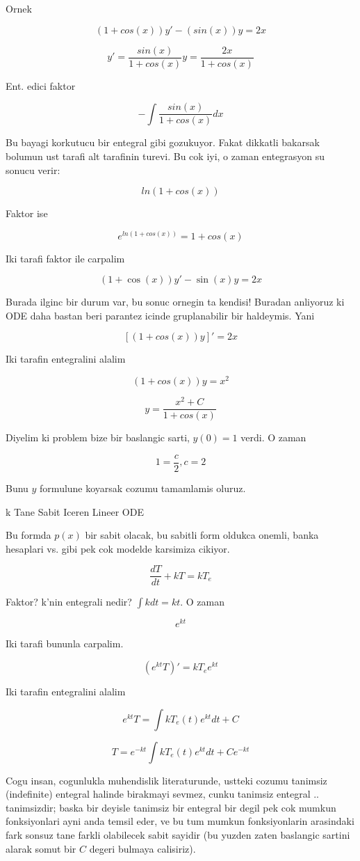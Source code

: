 \documentclass[12pt,fleqn]{article}\usepackage{../common}
\begin{document}
Ornek 

\[ (1+cos(x))y' - (sin(x))y = 2x \]

\[ y' = \frac{sin(x)}{1+cos(x)}y = \frac{2x}{1+cos(x)} \]

Ent. edici faktor

\[ - \int \frac{sin(x)}{1+cos(x)} dx \]

Bu bayagi korkutucu bir entegral gibi gozukuyor. Fakat dikkatli
bakarsak bolumun ust tarafi alt tarafinin turevi. Bu cok iyi, o zaman
entegrasyon su sonucu verir:

\[ ln (1+cos(x)) \]

Faktor ise

\[ e^{ln (1+cos(x))} = 1+cos(x) \]

Iki tarafi faktor ile carpalim

\[ (1+\cos(x)) y' - \sin(x)y = 2x \]

Burada ilginc bir durum var, bu sonuc ornegin ta kendisi! Buradan
anliyoruz ki ODE daha bastan beri parantez icinde gruplanabilir bir
haldeymis. Yani

\[ [(1+cos(x))y]' = 2x \]

Iki tarafin entegralini alalim

\[ (1+cos(x))y = x^2 \]

\[ y = \frac{x^2+C}{1+cos(x)} \]

Diyelim ki problem bize bir baslangic sarti, $y(0) = 1$ verdi. O zaman

\[ 1=\frac{c}{2}, c=2 \]

Bunu $y$ formulune koyarsak cozumu tamamlamis oluruz. 

k Tane Sabit Iceren Lineer ODE

Bu formda $p(x)$ bir sabit olacak, bu sabitli form oldukca onemli,
banka hesaplari vs. gibi pek cok modelde karsimiza cikiyor.

\[ \frac{dT}{dt} + kT = kT_e \]

Faktor? k'nin entegrali nedir? $\int k dt = kt$. O zaman

\[ e^{kt} \]

Iki tarafi bununla carpalim. 

\[ (e^{kt} T)' = kT_e e^{kt} \]

Iki tarafin entegralini alalim

\[ e^{kt} T = \int kT_e(t) e^{kt}dt + C\]

\[ T = e^{-kt} \int kT_e(t) e^{kt} dt + C e^{-kt} \]

Cogu insan, cogunlukla muhendislik literaturunde, ustteki cozumu
tanimsiz (indefinite) entegral halinde birakmayi sevmez, cunku
tanimsiz entegral .. tanimsizdir; baska bir deyisle tanimsiz bir
entegral bir degil pek cok mumkun fonksiyonlari ayni anda temsil eder,
ve bu tum mumkun fonksiyonlarin arasindaki fark sonsuz tane farkli
olabilecek sabit sayidir (bu yuzden zaten baslangic sartini alarak
somut bir $C$ degeri bulmaya calisiriz). 
\end{document}
